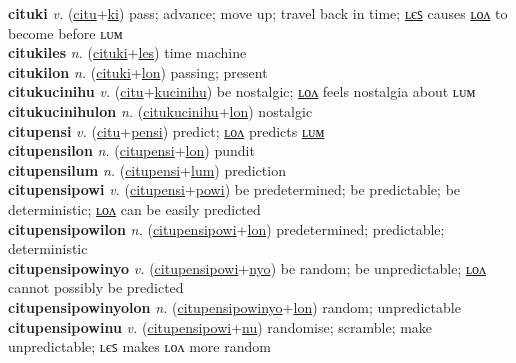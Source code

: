 \textbf{cituki} \textit{v.} (\hyperref[citu]{citu}+\hyperref[ki]{ki})
pass; advance; move up; travel back in time; \hyperref[citukiles]{ʟєꜱ} causes \hyperref[citukilon]{ʟᴏᴧ} to become before ʟᴜᴍ \label{cituki} \\
\textbf{citukiles} \textit{n.} (\hyperref[cituki]{cituki}+\hyperref[les]{les})
time machine \label{citukiles} \\
\textbf{citukilon} \textit{n.} (\hyperref[cituki]{cituki}+\hyperref[lon]{lon})
passing; present \label{citukilon} \\
\textbf{citukucinihu} \textit{v.} (\hyperref[citu]{citu}+\hyperref[kucinihu]{kucinihu})
be nostalgic; \hyperref[citukucinihulon]{ʟᴏᴧ} feels nostalgia about ʟᴜᴍ \label{citukucinihu} \\
\textbf{citukucinihulon} \textit{n.} (\hyperref[citukucinihu]{citukucinihu}+\hyperref[lon]{lon})
nostalgic \label{citukucinihulon} \\
\textbf{citupensi} \textit{v.} (\hyperref[citu]{citu}+\hyperref[pensi]{pensi})
predict; \hyperref[citupensilon]{ʟᴏᴧ} predicts \hyperref[citupensilum]{ʟᴜᴍ} \label{citupensi} \\
\textbf{citupensilon} \textit{n.} (\hyperref[citupensi]{citupensi}+\hyperref[lon]{lon})
pundit \label{citupensilon} \\
\textbf{citupensilum} \textit{n.} (\hyperref[citupensi]{citupensi}+\hyperref[lum]{lum})
prediction \label{citupensilum} \\
\textbf{citupensipowi} \textit{v.} (\hyperref[citupensi]{citupensi}+\hyperref[powi]{powi})
be predetermined; be predictable; be deterministic; \hyperref[citupensipowilon]{ʟᴏᴧ} can be easily predicted \label{citupensipowi} \\
\textbf{citupensipowilon} \textit{n.} (\hyperref[citupensipowi]{citupensipowi}+\hyperref[lon]{lon})
predetermined; predictable; deterministic \label{citupensipowilon} \\
\textbf{citupensipowinyo} \textit{v.} (\hyperref[citupensipowi]{citupensipowi}+\hyperref[nyo]{nyo})
be random; be unpredictable; \hyperref[citupensipowinyolon]{ʟᴏᴧ} cannot possibly be predicted \label{citupensipowinyo} \\
\textbf{citupensipowinyolon} \textit{n.} (\hyperref[citupensipowinyo]{citupensipowinyo}+\hyperref[lon]{lon})
random; unpredictable \label{citupensipowinyolon} \\
\textbf{citupensipowinu} \textit{v.} (\hyperref[citupensipowi]{citupensipowi}+\hyperref[nu]{nu})
randomise; scramble; make unpredictable; ʟєꜱ makes ʟᴏᴧ more random \label{citupensipowinu} \\
